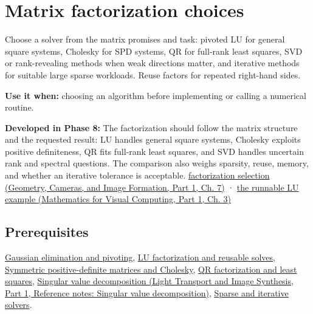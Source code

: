 \hypertarget{appendix-221a483bec2d}{}\label{referencestart:appendix-221a483bec2d}
\section{Matrix factorization choices}\label{appendix-221a483bec2d-matrix-factorization-choices}

\hypertarget{appendix-221a483bec2d-matrix-factorization-choices}{}

Choose a solver from the matrix promises and task: pivoted LU for general square systems, Cholesky for SPD systems, QR for full-rank least squares, SVD or rank-revealing methods when weak directions matter, and iterative methods for suitable large sparse workloads. Reuse factors for repeated right-hand sides.

\textbf{Use it when:} choosing an algorithm before implementing or calling a numerical routine.

\textbf{Developed in Phase 8:} The factorization should follow the matrix structure and the requested result: LU handles general square systems, Cholesky exploits positive definiteness, QR fits full-rank least squares, and SVD handles uncertain rank and spectral questions. The comparison also weighs sparsity, reuse, memory, and whether an iterative tolerance is acceptable. \href{../03-Geometry-Cameras-and-Image-Formation-P01/main.pdf\#nameddest=02-foundations-ii-ch038-choose-a-factorization-from-structure-and-the-requested-answer}{factorization selection (Geometry, Cameras, and Image Formation, Part 1, Ch. 7)} · \href{../02-Mathematics-for-Visual-Computing-P01/main.pdf\#nameddest=01-foundations-i-ch019-a-runnable-pivoted-lu-reference-preserves-the-elimination-history}{the runnable LU example (Mathematics for Visual Computing, Part 1, Ch. 3)}

\subsection{Prerequisites}\label{appendix-221a483bec2d-prerequisites}

\hypertarget{appendix-221a483bec2d-prerequisites}{}

\hyperref[appendix-f6e77f4a200f]{Gaussian elimination and pivoting}, \hyperref[appendix-55e4b5b0a1e6]{LU factorization and reusable solves}, \hyperref[appendix-50d2ea3c9b26]{Symmetric positive-definite matrices and Cholesky}, \hyperref[appendix-c3421e6b4f2c]{QR factorization and least squares}, \href{../04-Light-Transport-and-Image-Synthesis-P01/main.pdf\#nameddest=appendix-1fad5e7f36fa}{Singular value decomposition (Light Transport and Image Synthesis, Part 1, Reference notes: Singular value decomposition)}, \hyperref[appendix-67c87a3d9e94]{Sparse and iterative solvers}.

